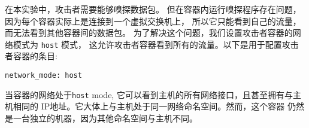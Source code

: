 在本实验中，攻击者需要能够嗅探数据包。
但在容器内运行嗅探程序存在问题，因为每个容器实际上是连接到一个虚拟交换机上，
所以它只能看到自己的流量，而无法看到其他容器间的数据包。
为了解决这个问题，我们设置攻击者容器的网络模式为 \texttt{host} 模式，
这允许攻击者容器看到所有的流量。以下是用于配置攻击者容器的条目:

\begin{lstlisting}
network_mode: host
\end{lstlisting}

当容器的网络处于\texttt{host} mode,  它可以看到主机的所有网络接口，且甚至拥有与主机相同的
IP地址。它大体上与主机处于同一网络命名空间。然而，这个容器
仍然是一台独立的机器，因为其他命名空间与主机不同。
